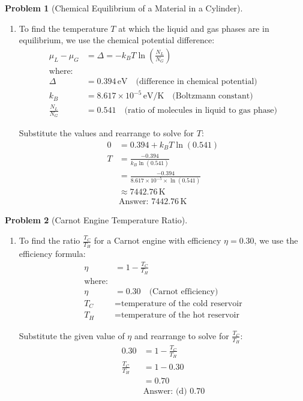 \documentclass[12pt]{article}
\theoremstyle{definition} %
\newtheorem{problem}{Problem}
\theoremstyle{plain} %
\begin{document}
\begin{problem}[Chemical Equilibrium of a Material in a Cylinder]
    \noindent
    \begin{enumerate}
        \item 
        To find the temperature \( T \) at which the liquid and gas phases are in equilibrium, we use the chemical potential difference:
        \begin{align*}
        \mu_L - \mu_G &= \Delta = - k_B T \ln \left( \frac{N_L}{N_G} \right) \\
        \text{where:} \\
        \Delta &= 0.394 \, \text{eV} \quad \text{(difference in chemical potential)} \\
        k_B &= 8.617 \times 10^{-5} \, \text{eV/K} \quad \text{(Boltzmann constant)} \\
        \frac{N_L}{N_G} &= 0.541 \quad \text{(ratio of molecules in liquid to gas phase)}
        \end{align*}

        Substitute the values and rearrange to solve for \( T \):
        \begin{align*}
        0 &= 0.394 + k_B T \ln(0.541) \\
        T &= \frac{-0.394}{k_B \ln(0.541)} \\
        &= \frac{-0.394}{8.617 \times 10^{-5} \times \ln(0.541)} \\
        &\approx 7442.76 \, \text{K} \\
        &\text{Answer: } 7442.76 \, \text{K}
        \end{align*}
    \end{enumerate}
\end{problem}
\begin{problem}[Carnot Engine Temperature Ratio]
    \noindent
    \begin{enumerate}
        \item 
        To find the ratio \( \frac{T_C}{T_H} \) for a Carnot engine with efficiency \( \eta = 0.30 \), we use the efficiency formula:
        \begin{align*}
        \eta &= 1 - \frac{T_C}{T_H} \\
        \text{where:} \\
        \eta &= 0.30 \quad \text{(Carnot efficiency)} \\
        T_C &= \text{temperature of the cold reservoir} \\
        T_H &= \text{temperature of the hot reservoir}
        \end{align*}

        Substitute the given value of \( \eta \) and rearrange to solve for \( \frac{T_C}{T_H} \):
        \begin{align*}
        0.30 &= 1 - \frac{T_C}{T_H} \\
        \frac{T_C}{T_H} &= 1 - 0.30 \\
        &= 0.70 \\
        &\text{Answer: (d) } 0.70
        \end{align*}
    \end{enumerate}
\end{problem}
\end{document}
